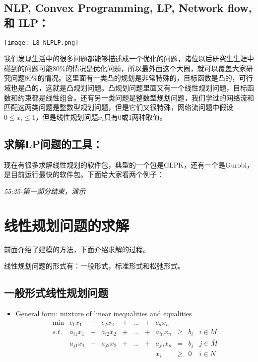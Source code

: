 \subsection{NLP, Convex Programming, LP, Network flow, 和 ILP：}

\begin{center}
	\texttt{[image: L8-NLPLP.png]}
\end{center}

我们发现生活中的很多问题都能够描述成一个优化的问题，诸位以后研究生生涯中碰到的问题可能80\%的情况是优化问题，所以最外面这个大圈，就可以覆盖大家研究问题80\%的情况。这里面有一类凸的规划是非常特殊的，目标函数是凸的，可行域也是凸的，这就是凸规划问题。凸规划问题里面又有一个线性规划问题，目标函数和约束都是线性组合。还有另一类问题是整数型规划问题，我们学过的网络流和匹配这两类问题是整数型规划问题，但是它们又很特殊，网络流问题中假设$ 0 \leq x_{i} \leq 1 $，但是线性规划问题$ x_{i} $只有0或1两种取值。

\subsection{求解LP问题的工具：}
现在有很多求解线性规划的软件包，典型的一个包是GLPK，还有一个是Gurobi，是目前运行最快的软件包。下面给大家看两个例子：

\emph{55:25-第一部分结束，演示}

\section{线性规划问题的求解}

前面介绍了建模的方法，下面介绍求解的过程。

线性规划问题的形式有：一般形式，标准形式和松弛形式。

\subsection{一般形式线性规划问题}
\begin{itemize}
\item
General form: mixture of linear inequalities and equalities
\[
\begin{array}{rrrrrrrrrrrrl}\nonumber
 \min & c_1x_1    &+&  c_2x_2   &+&  ...&+& c_nx_n    &      &     & \\
 s.t. & a_{i1}x_1 &+& a_{i2}x_2 &+& ... &+& a_{in}x_n & \geq & b_i & i \in M\\
      & a_{j1}x_1 &+& a_{j2}x_2 &+& ... &+& a_{jn}x_n &  =   & b_j & j \in \overline{M} \\
      &           & &           & &     & &       x_i & \geq & 0   & i \in N
     \end{array} \nonumber
\]
\end{itemize}

